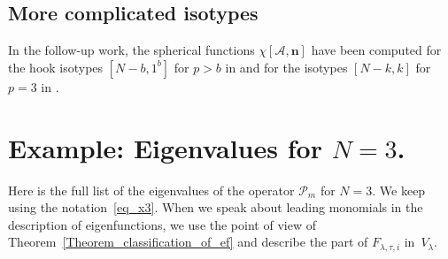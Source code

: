 \documentclass[11pt]{article}
\theoremstyle{definition}
\numberwithin{equation}{section}
\newcommand{\PP}{\mathcal P}
\begin{document}
\subsection{More complicated isotypes}
In the follow-up work, the spherical functions $\chi\left[  \mathcal{A},\mathbf{n}\right]  $ have
been computed for the hook isotypes $\left[  N-b,1^{b}\right]  $ for $p>b$ in
\cite{Dun25a} and for the isotypes $\left[  N-k,k\right]  $ for $p=3$ in
\cite{Dun25b}.

\section{Example: Eigenvalues for \texorpdfstring{$N=3$}{N=3}.}
\label{Section_N3}

Here is the full list of the eigenvalues of the operator $\PP_m$ for $N=3$. We keep using the notation~\eqref{eq_x3}. When we speak about leading monomials in the description of eigenfunctions, we use the point of view of Theorem~\ref{Theorem_classification_of_ef} and describe the part of $F_{\lambda,\tau,i}$ in~$V_\lambda$.
\end{document}
